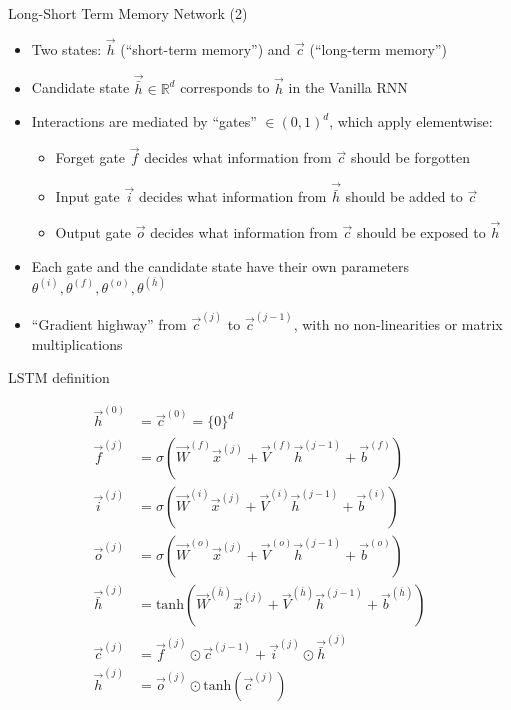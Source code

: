 \documentclass[11pt,compress,t,notes=noshow, xcolor=table]{beamer}
\begin{document}
\begin{vbframe}{Long-Short Term Memory Network (2)}

\vfill

\begin{itemize}
	\item Two states: $\vec h$ (``short-term memory'') and $\vec c$ (``long-term memory'')
	\item Candidate state $\vec{\bar{h}} \in \mathbb{R}^d$ corresponds to $\vec h$ in the Vanilla RNN
	\item Interactions are mediated by ``gates'' $\in (0, 1)^d$, which apply elementwise:
		\begin{itemize}
			\item Forget gate $\vec f$ decides what information from $\vec c$ should be forgotten
			\item Input gate $\vec i$ decides what information from $\vec {\bar{h}}$ should be added to $\vec c$
			\item Output gate $\vec o$ decides what information from $\vec c$ should be exposed to $\vec h$
		\end{itemize}
	\item Each gate and the candidate state have their own parameters $\theta^{(i)}, \theta^{(f)}, \theta^{(o)}, \theta^{(\bar{h})}$
	\item ``Gradient highway'' from $\vec c^{(j)}$ to $\vec c^{(j-1)}$, with no non-linearities or matrix multiplications
\end{itemize}

\vfill

\end{vbframe}


\begin{vbframe}{LSTM definition}

\vskip-1mm

\vfill

$$
\begin{aligned}
\vec h^{(0)} & = \vec c^{(0)} = \{0\}^d \\
\vec f^{(j)} & = \sigma(\vec W^{(f)} \vec x^{(j)} + \vec V^{(f)} \vec h^{(j-1)} + \vec b^{(f)}) \\
\vec i^{(j)} & = \sigma(\vec W^{(i)} \vec x^{(j)} + \vec V^{(i)} \vec h^{(j-1)} + \vec b^{(i)}) \\
\vec o^{(j)} & = \sigma(\vec W^{(o)} \vec x^{(j)} + \vec V^{(o)} \vec h^{(j-1)} + \vec b^{(o)}) \\
\vec {\bar{h}}^{(j)} & = \mathrm{tanh}(\vec W^{(\bar{h})} \vec x^{(j)} + \vec V^{(\bar{h})} \vec h^{(j-1)} + \vec b^{(\bar{h})}) \\
\vec c^{(j)} & = \vec f^{(j)} \odot \vec c^{(j-1)} + \vec i^{(j)} \odot \vec {\bar{h}}^{(j)} \\
\vec h^{(j)} &= \vec o^{(j)} \odot \mathrm{tanh}(\vec c^{(j)})
\end{aligned}
$$

\vfill

\end{vbframe}
\end{document}
